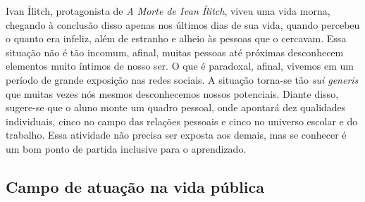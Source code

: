 \documentclass[12pt]{extarticle}
\begin{document}
\begin{comment}\begin{quote}
O campo da vida pessoal pretende funcionar como espaço de articulações
e sínteses das aprendizagens de outros campos postas a serviço dos
projetos de vida dos estudantes. As práticas de linguagem privilegiadas
nesse campo relacionam"-se com a ampliação do saber sobre si, tendo em
vista as condições que cercam a vida contemporânea e as condições
juvenis no Brasil e no mundo.

Está em questão também possibilitar vivências significativas de práticas
colaborativas em situações de interação presenciais ou em ambientes
digitais e aprender, na articulação com outras áreas, campos e com os
projetos e escolhas pessoais dos jovens, procedimentos de levantamento,
tratamento e divulgação de dados e informações e o uso desses dados em
produções diversas e na proposição de ações e projetos de natureza
variada, para fomentar o protagonismo juvenil de forma
contextualizada. (\textsc{bncc}, p. 494)
\end{quote}
\end{comment}


Ivan Ílitch, protagonista de \emph{A Morte de Ivan Ílitch}, viveu uma
vida morna, chegando à conclusão disso apenas nos últimos dias de sua
vida, quando percebeu o quanto era infeliz, além de estranho e alheio
às pessoas que o cercavam. Essa situação não é tão incomum, afinal,
muitas pessoas até próximas desconhecem elementos muito íntimos de
nosso ser. O que é paradoxal, afinal, vivemos em um período de grande
exposição nas redes sociais. A situação torna-se tão \emph{sui
generis} que muitas vezes nós mesmos desconhecemos nossos potenciais.
Diante disso, sugere-se que o aluno monte um quadro pessoal, onde
apontará dez qualidades individuais, cinco no campo das relações
pessoais e cinco no universo escolar e do trabalho. Essa atividade não
precisa ser exposta aos demais, mas se conhecer é um bom ponto de
partida inclusive para o aprendizado.

\subsection{Campo de atuação na vida pública}

\begin{comment}
\begin{quote}
No cerne do campo de atuação na vida pública estão a ampliação da
participação em diferentes instâncias da vida pública, a defesa dos
direitos, o domínio básico de textos legais e a discussão e o debate de
ideias, propostas e projetos. {[}\ldots{}{]}

Ainda no domínio das ênfases, indica"-se um conjunto de habilidades que
se relacionam com a análise, discussão, elaboração e desenvolvimento de
propostas de ação e de projetos culturais e de intervenção social.
(\textsc{bncc}, p. 494)
\end{quote}
\end{comment}
\end{document}
